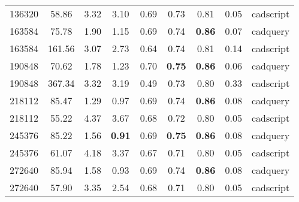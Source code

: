 \begin{table}[]
\begin{tabular}{ccccccccc}
		136320              & 58.86                 & 3.32                  & 3.10                   & 0.69                   & 0.73                   & 0.81                    & 0.05          & cadscript \\
		163584              & 75.78                 & 1.90                  & 1.15                   & 0.69                   & 0.74                   & \textbf{0.86}           & 0.07          & cadquery  \\
		163584              & 161.56                & 3.07                  & 2.73                   & 0.64                   & 0.74                   & 0.81                    & 0.14          & cadscript \\
		190848              & 70.62                 & 1.78                  & 1.23                   & 0.70                   & \textbf{0.75}          & \textbf{0.86}           & 0.06          & cadquery  \\
		190848              & 367.34                & 3.32                  & 3.19                   & 0.49                   & 0.73                   & 0.80                    & 0.33          & cadscript \\
		218112              & 85.47                 & 1.29                  & 0.97                   & 0.69                   & 0.74                   & \textbf{0.86}           & 0.08          & cadquery  \\
		218112              & 55.22                 & 4.37                  & 3.67                   & 0.68                   & 0.72                   & 0.80                    & 0.05          & cadscript \\
		245376              & 85.22                 & 1.56                  & \textbf{0.91}          & 0.69                   & \textbf{0.75}          & \textbf{0.86}           & 0.08          & cadquery  \\
		245376              & 61.07                 & 4.18                  & 3.37                   & 0.67                   & 0.71                   & 0.80                    & 0.05          & cadscript \\
		272640              & 85.94                 & 1.58                  & 0.93                   & 0.69                   & 0.74                   & \textbf{0.86}           & 0.08          & cadquery  \\
		272640              & 57.90                 & 3.35                  & 2.54                   & 0.68                   & 0.71                   & 0.80                    & 0.05          & cadscript \\
		\hline
	\end{tabular}
\end{table}

